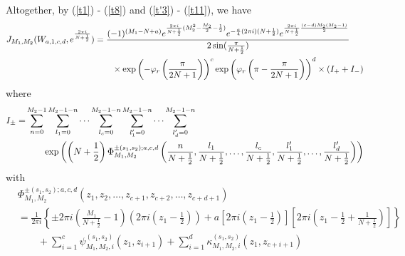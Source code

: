 \documentclass[10pt,a4paper]{article}
\newcommand{\lt}{\left}
\newcommand{\rt}{\right}
\begin{document}
Altogether, by (\ref{t1}) - (\ref{t8}) and (\ref{t'3}) - (\ref{t11}), we have
\begin{align}
 J_{M_1, M_2} (W_{a,1,c,d}, e^{\frac{2\pi i}{N+\frac{1}{2}}})
&=   \frac{(-1)^{(M_1 - N+a) } e^{\frac{2\pi i}{N+\frac{1}{2}}(M_2^2 - \frac{M_2}{2} - \frac{1}{2})}  e^{- \frac{a}{4}(2\pi i)(N+\frac{1}{2})} e^{\frac{2\pi i}{N+\frac{1}{2}}\frac{(c-d)M_2(M_2-1)}{2}}}{2\sin(\frac{\pi}{N+\frac{1}{2}})} \notag\\
&\qquad \times 
\exp\lt(  -\varphi_r \lt(  \frac{\pi}{2N+1}\rt)\rt)^{c}
\exp\lt(  \varphi_r \lt(\pi  - \frac{\pi}{2N+1}\rt)\rt)^{d}
\times (I_+ + I_-) 
\end{align}
where
\begin{align}
I_\pm =
&  
\sum_{n=0}^{M_2-1} \sum_{l_1=0}^{M_2-1-n}\dots \sum_{l_c=0}^{M_2-1-n} \sum_{l_1'=0}^{M_2-1-n}\dots \sum_{l_d'=0}^{M_2-1-n} \notag\\
&\qquad \exp\lt( \lt(N+\frac{1}{2}\rt)\Phi^{\pm(s_1, s_2);a,c,d}_{M_1, M_2} 
\lt(\frac{n}{N+\frac{1}{2}},\frac{l_1}{N+\frac{1}{2}},\dots, \frac{l_c}{N+\frac{1}{2}}, \frac{l_1'}{N+\frac{1}{2}},\dots, \frac{l_d'}{N+\frac{1}{2}} \rt) \rt)
\end{align}
with 
\begin{align*}
&\Phi^{\pm (s_1,s_2);a,c,d}_{M_1,M_2} (z_1, z_2, \dots, z_{c+1}, z_{c+2},\dots, z_{c+d+1}) \\
&=  \frac{1}{2\pi i} \lt\{  \pm2\pi i  \lt( \frac{M_1}{N+\frac{1}{2}} - 1\rt) \lt(2\pi i \lt(z_1 -\frac{1}{2} \rt)\rt) 
+ a \lt[2\pi i \lt(z_1-\frac{1}{2} \rt) \rt] \lt[ 2\pi i \lt(z_1-\frac{1}{2}+ \frac{1}{N+\frac{1}{2}}  \rt) \rt]\rt\}  \\
&\qquad  + \sum_{i=1}^c \psi_{M_1,M_2,i}^{(s_1,s_2)} (z_1,z_{i+1}) + \sum_{i=1}^d \kappa_{M_1,M_2,i}^{(s_1,s_2)}(z_1,z_{c+i+1})
\end{align*}
\end{document}
